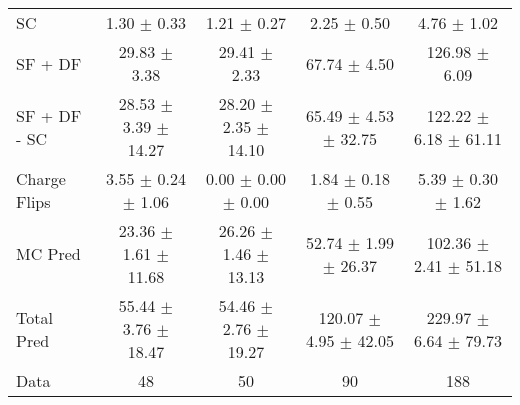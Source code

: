 \begin{tabular}{l|cccc}
                                 SC &  1.30 $\pm$  0.33 &  1.21 $\pm$  0.27 &  2.25 $\pm$  0.50 &  4.76 $\pm$  1.02 \\
                            SF + DF & 29.83 $\pm$  3.38 & 29.41 $\pm$  2.33 & 67.74 $\pm$  4.50 & 126.98 $\pm$  6.09 \\
\hline
                       SF + DF - SC & 28.53 $\pm$  3.39 $\pm$ 14.27 & 28.20 $\pm$  2.35 $\pm$ 14.10 & 65.49 $\pm$  4.53 $\pm$ 32.75 & 122.22 $\pm$  6.18 $\pm$ 61.11 \\
\hline\hline
                       Charge Flips &  3.55 $\pm$  0.24 $\pm$  1.06 &  0.00 $\pm$  0.00 $\pm$  0.00 &  1.84 $\pm$  0.18 $\pm$  0.55 &  5.39 $\pm$  0.30 $\pm$  1.62 \\
\hline
                            MC Pred & 23.36 $\pm$  1.61 $\pm$ 11.68 & 26.26 $\pm$  1.46 $\pm$ 13.13 & 52.74 $\pm$  1.99 $\pm$ 26.37 & 102.36 $\pm$  2.41 $\pm$ 51.18 \\
\hline
                         Total Pred & 55.44 $\pm$  3.76 $\pm$ 18.47 & 54.46 $\pm$  2.76 $\pm$ 19.27 & 120.07 $\pm$  4.95 $\pm$ 42.05 & 229.97 $\pm$  6.64 $\pm$ 79.73 \\
\hline\hline
                               Data &    48 &    50 &    90 &   188 \\
\hline\hline
\end{tabular}


